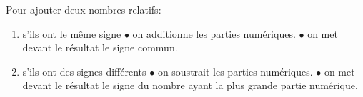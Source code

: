 Pour ajouter deux nombres relatifs:
\begin{enumerate}
    \item s'ils ont le même signe
    \subitem$\bullet$ on additionne les parties numériques.
    \subitem$\bullet$ on met devant le résultat le signe commun.
    \item s'ils ont des signes différents
    \subitem$\bullet$ on soustrait les parties numériques.
    \subitem$\bullet$ on met devant le résultat le signe du nombre ayant la
    plus grande partie numérique.\hfill
\end{enumerate}